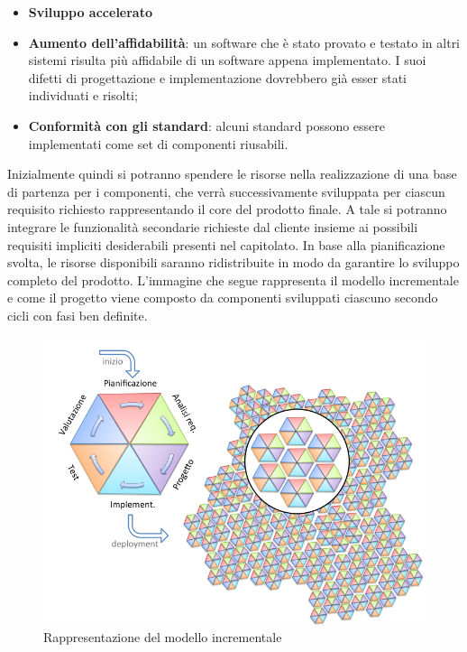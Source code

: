 \begin{itemize}
\begin{itemize}
			\item \textbf{Sviluppo accelerato}
			\item \textbf{Aumento dell'affidabilità}: un software che è stato provato e testato in altri sistemi risulta più affidabile di un software appena implementato. I suoi difetti di progettazione e implementazione dovrebbero già esser stati individuati e risolti;
			\item \textbf{Conformità con gli standard}: alcuni standard
			possono essere implementati come set di componenti riusabili.
		\end{itemize}
	\end{itemize}
	Inizialmente quindi si potranno spendere le risorse nella realizzazione di una base di partenza per i componenti, che verrà successivamente sviluppata per ciascun requisito richiesto rappresentando il core del prodotto finale.
	A tale  si potranno integrare le funzionalità secondarie richieste dal cliente insieme ai possibili requisiti impliciti desiderabili presenti nel capitolato. In base alla pianificazione svolta, le risorse disponibili saranno ridistribuite in modo da garantire lo sviluppo completo del prodotto.
	L'immagine che segue rappresenta il modello incrementale e come il progetto viene composto da componenti sviluppati ciascuno secondo cicli con fasi ben definite.
	\begin{figure}[H]
		\centering
		\includegraphics[scale=0.5]{img/modello_incrementale.png}
		\caption{Rappresentazione del modello incrementale \protect\footnotemark}
	\end{figure}

	